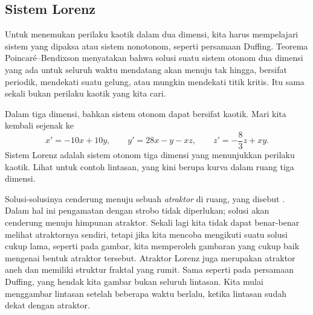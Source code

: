 \subsection{Sistem Lorenz}

Untuk menemukan perilaku kaotik dalam dua dimensi, kita harus mempelajari
sistem yang dipaksa atau sistem nonotonom, seperti persamaan Duffing.
Teorema Poincar\'e--Bendixson menyatakan bahwa solusi suatu sistem otonom dua
dimensi yang ada untuk seluruh waktu mendatang akan menuju tak hingga,
bersifat periodik, mendekati suatu gelung, atau mungkin mendekati titik
kritis.  Itu sama sekali bukan perilaku kaotik yang kita cari.

Dalam tiga dimensi, bahkan sistem otonom dapat bersifat kaotik.  Mari kita
kembali sejenak ke 
\begin{equation*}
x' = -10x +10y, \qquad y' = 28x-y-xz, \qquad z'=-\frac{8}{3}z + xy .
\end{equation*}
Sistem Lorenz adalah sistem otonom tiga dimensi yang menunjukkan perilaku
kaotik.  Lihat  untuk contoh lintasan, yang kini berupa
kurva dalam ruang tiga dimensi.
\begin{myfig}
\capstart
{}
\caption{Sebuah lintasan dalam sistem Lorenz. \label{nlin:lorenz}}
\end{myfig}

Solusi-solusinya cenderung menuju sebuah \emph{atraktor} di ruang, yang disebut
\emph{}.  Dalam hal ini pengamatan dengan strobo tidak
diperlukan; solusi akan cenderung menuju himpunan atraktor.  Sekali lagi kita
tidak dapat benar-benar melihat atraktornya sendiri, tetapi jika kita mencoba
mengikuti suatu solusi cukup lama, seperti pada gambar, kita memperoleh
gambaran yang cukup baik mengenai bentuk atraktor tersebut.  Atraktor Lorenz
juga merupakan atraktor aneh dan memiliki struktur fraktal yang rumit.  Sama
seperti pada persamaan Duffing, yang hendak kita gambar bukan seluruh lintasan.
Kita mulai menggambar lintasan setelah beberapa waktu berlalu, ketika lintasan
sudah dekat dengan atraktor.

